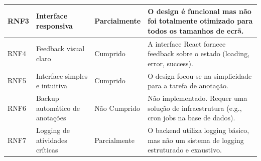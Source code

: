 \begin{longtable}{|p{}|p{}|p{}|p{}|}
    \hline
    RNF3 & Interface responsiva & Parcial\-mente & O design é funcional mas não foi totalmente otimizado para todos os tamanhos de ecrã. \\
    \hline
    RNF4 & Feedback visual claro & Cumprido & A interface React fornece feedback sobre o estado (loading, error, success). \\
    \hline
    RNF5 & Interface simples e intuitiva & Cumprido & O design focou-se na simplicidade para a tarefa de anotação. \\
    \hline
    RNF6 & Backup automático de anotações & Não Cumprido & Não implementado. Requer uma solução de infraestrutura (e.g., cron jobs na base de dados). \\
    \hline
    RNF7 & Logging de atividades críticas & Parcial\-mente & O backend utiliza logging básico, mas não um sistema de logging estruturado e exaustivo. \\
    \hline
\end{longtable}